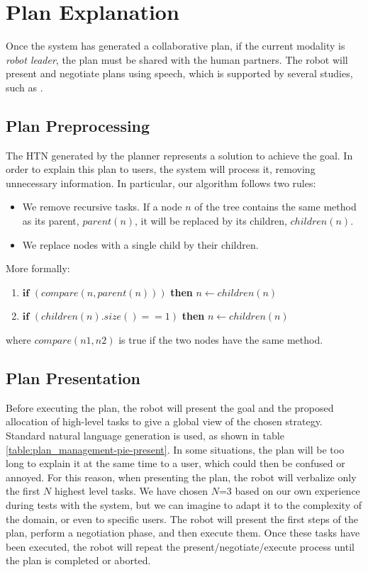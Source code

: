 \section{Plan Explanation}
\label{sec:plan_management-plan_explanation}
Once the system has generated a collaborative plan, if the current modality is \textit{robot leader}, the plan must be shared with the human partners. The robot will present and negotiate plans using speech, which is supported by several studies, such as \cite{Lallee2013,tomasello2005}.

\subsection{Plan Preprocessing}
The HTN generated by the planner represents a solution to achieve the goal. In order to explain this plan to users, the system will process it, removing unnecessary information. In particular, our algorithm follows two rules:
\begin{itemize}
	\item  We remove recursive tasks. If a node $n$ of the tree contains the same method as its parent, $parent(n)$, it will be replaced by its children, $children(n)$. 
	\item We replace nodes with a single child by their children.
\end{itemize}

More formally:
\begin{enumerate}
\item $\textbf{if}$ $(compare(n, parent(n)))$ \textbf{then} $n \leftarrow children(n)$
\item $\textbf{if}$ $(children(n).size() == 1)$ \textbf{then} $n \leftarrow children(n)$
\end{enumerate}

where $compare(n1,n2)$ is true if the two nodes have the same method.

\subsection{Plan Presentation}
Before executing the plan, the robot will present the goal and the proposed allocation of high-level tasks to give a global view of the chosen strategy. Standard natural language generation is used, as shown in table \ref{table:plan_management-pie-present}. 
In some situations, the plan will be too long to explain it at the same time to a user, which could then be confused or annoyed. For this reason, when presenting the plan, the robot will verbalize only the first $N$  highest level tasks. We have chosen $N$=$3$ based on our own experience during tests with the system, but we can imagine to adapt it to the complexity of the domain, or even to specific users. The robot will present the first steps of the plan, perform a negotiation phase, and then execute them. Once these tasks have been executed, the robot will repeat the present/negotiate/execute process until the plan is completed or aborted.
 
